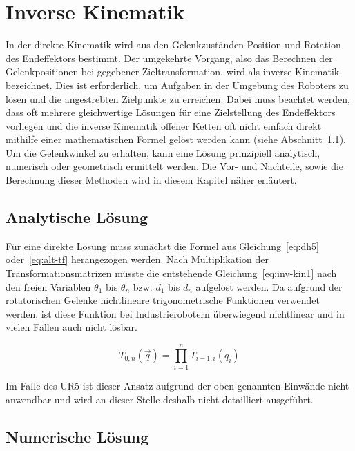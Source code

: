 \cleardoublepage


\chapter{Inverse Kinematik}\label{ch:inverse-kinematik}

In der direkte Kinematik wird aus den Gelenkzuständen Position und Rotation des Endeffektors bestimmt.
Der umgekehrte Vorgang, also das Berechnen der Gelenkpositionen bei gegebener Zieltransformation, wird als inverse Kinematik bezeichnet.
Dies ist erforderlich, um Aufgaben in der Umgebung des Roboters zu lösen und die angestrebten Zielpunkte zu erreichen.
Dabei muss beachtet werden, dass oft mehrere gleichwertige Lösungen für eine Zielstellung des Endeffektors vorliegen und die inverse Kinematik offener Ketten oft nicht einfach direkt mithilfe einer mathematischen Formel gelöst werden kann (siehe Abschnitt~\ref{sec:analytische-losung}).
Um die Gelenkwinkel zu erhalten, kann eine Lösung prinzipiell analytisch, numerisch oder geometrisch ermittelt werden.
Die Vor- und Nachteile, sowie die Berechnung dieser Methoden wird in diesem Kapitel näher erläutert.


\section{Analytische Lösung}\label{sec:analytische-losung}

Für eine direkte Lösung muss zunächst die Formel aus Gleichung~\ref{eq:dh5} oder~\ref{eq:alt-tf} herangezogen werden.
Nach Multiplikation der Transformationsmatrizen müsste die entstehende Gleichung~\ref{eq:inv-kin1} nach den freien Variablen $\theta_1$ bis $\theta_n$ bzw. $d_1$ bis $d_n$ aufgelöst werden.
Da aufgrund der rotatorischen Gelenke nichtlineare trigonometrische Funktionen verwendet werden, ist diese Funktion bei Industrierobotern überwiegend nichtlinear und in vielen Fällen auch nicht lösbar.

\begin{equation}
    T_{0,n}(\overrightarrow{q}) = \prod_{i=1}^{n} T_{i-1,i}(q_i)     \label{eq:inv-kin1}
\end{equation}

Im Falle des UR5 ist dieser Ansatz aufgrund der oben genannten Einwände nicht anwendbar und wird an dieser Stelle deshalb nicht detailliert ausgeführt.


\section{Numerische Lösung}\label{sec:numerische-losung}

